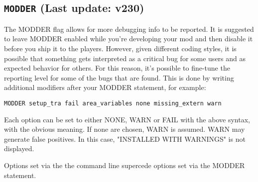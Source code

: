 \documentclass{article}
\def\DEFINE#1{{\tt \bf #1}\label{#1}\index{#1}}
\begin{document}
\subsection{\DEFINE{MODDER} (Last update: v230)}

The MODDER flag allows for more debugging info to be reported. It is suggested to
leave MODDER enabled while you're developing your mod and then disable it before
you ship it to the players. However, given different coding styles, it is possible
that something gets interpreted as a critical bug for some users and as expected
behavior for others. For this reason, it's possible to fine-tune the reporting level
for some of the bugs that are found. This is done by writing additional modifiers
after your MODDER statement, for example:
\begin{verbatim}
MODDER setup_tra fail area_variables none missing_extern warn
\end{verbatim}

Each option can be set to either NONE, WARN or FAIL with the above syntax,
with the obvious meaning. If none are chosen, WARN is assumed. WARN may generate false positives.
In this case, "INSTALLED WITH WARNINGS" is not displayed.

Options set via the the command line supercede options set via the MODDER statement.
\end{document}
